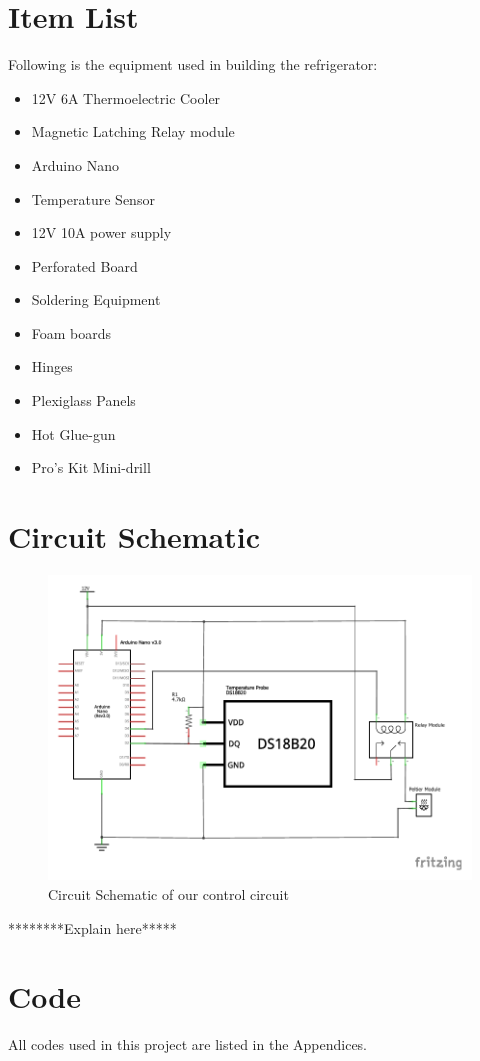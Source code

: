\documentclass[12pt,a4paper]{report}
\begin{document}
\section{Item List}
Following is the equipment used in building the refrigerator:
\begin{itemize}\itemsep -2pt
\item 12V 6A Thermoelectric Cooler
\item Magnetic Latching Relay module
\item Arduino Nano
\item Temperature Sensor
\item 12V 10A power supply
\item Perforated Board
\item Soldering Equipment
\item Foam boards
\item Hinges
\item Plexiglass Panels
\item Hot Glue-gun
\item Pro's Kit Mini-drill
\end{itemize}

\section{Circuit Schematic}
\begin{figure}[!h]
	\centering
	\includegraphics[scale=1.0]{mini_fridge_schem}
	\caption{Circuit Schematic of our control circuit}
\end{figure}
********Explain here*****

\section{Code}
All codes used in this project are listed in the Appendices.
\end{document}
